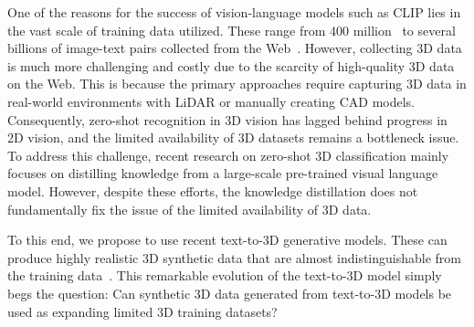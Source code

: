 One of the reasons for the success of vision-language models such as CLIP lies in the vast scale of training data utilized. These range from 400 million~\cite{radford2021learning} to several billions of image-text pairs collected from the Web~\cite{schuhmann2022laion}. 
However, collecting 3D data is much more challenging and costly due to the scarcity of high-quality 3D data on the Web. This is because the primary approaches require capturing 3D data in real-world environments with LiDAR or manually creating CAD models.
Consequently, zero-shot recognition in 3D vision has lagged behind progress in 2D vision, and the limited availability of 3D datasets remains a bottleneck issue. 
To address this challenge, recent research on zero-shot 3D classification mainly focuses on distilling knowledge from a large-scale pre-trained visual language model.
However, despite these efforts, the knowledge distillation does not fundamentally fix the issue of the limited availability of 3D data.



To this end, we propose to use recent text-to-3D generative models. 
These can produce highly realistic 3D synthetic data that are almost indistinguishable from the training data~\cite{liu2023zero,poole2022dreamfusion,lin2023magic3d,jun2023shap,nichol2022point}.
This remarkable evolution of the text-to-3D model simply begs the question: Can synthetic 3D data generated from text-to-3D models be used as expanding limited 3D training datasets? %


